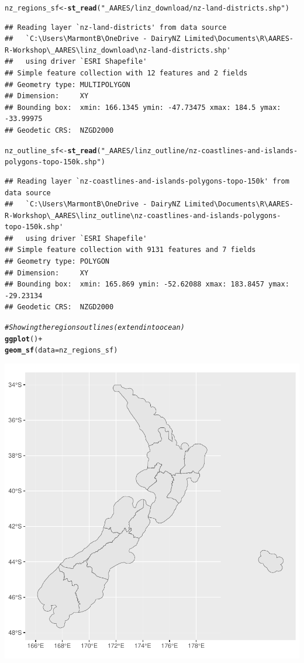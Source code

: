 \documentclass{article}\usepackage[]{graphicx}\usepackage[]{xcolor}
\makeatletter
\newcommand{\hlstr}[1]{\textcolor[rgb]{0.192,0.494,0.8}{#1}}%
\newcommand{\hlcom}[1]{\textcolor[rgb]{0.678,0.584,0.686}{\textit{#1}}}%
\newcommand{\hlopt}[1]{\textcolor[rgb]{0,0,0}{#1}}%
\newcommand{\hlstd}[1]{\textcolor[rgb]{0.345,0.345,0.345}{#1}}%
\newcommand{\hlkwb}[1]{\textcolor[rgb]{0.69,0.353,0.396}{#1}}%
\newcommand{\hlkwc}[1]{\textcolor[rgb]{0.333,0.667,0.333}{#1}}%
\newcommand{\hlkwd}[1]{\textcolor[rgb]{0.737,0.353,0.396}{\textbf{#1}}}%
\newenvironment{kframe}{%
 \def\at@end@of@kframe{}%
 \ifinner\ifhmode%
  \def\at@end@of@kframe{\end{minipage}}%
  \begin{minipage}{\columnwidth}%
 \fi\fi%
 \def\FrameCommand##1{\hskip\@totalleftmargin \hskip-\fboxsep
 \colorbox{shadecolor}{##1}\hskip-\fboxsep
     \hskip-\linewidth \hskip-\@totalleftmargin \hskip\columnwidth}%
 \MakeFramed {\advance\hsize-\width
   \@totalleftmargin\z@ \linewidth\hsize
   \@setminipage}}%
 {\par\unskip\endMakeFramed%
 \at@end@of@kframe}
\newenvironment{knitrout}{}{} %
\makeatother
\begin{document}
\begin{knitrout}
\begin{kframe}
\begin{alltt}
\hlstd{nz_regions_sf} \hlkwb{<-} \hlkwd{st_read}\hlstd{(}\hlstr{"_AARES/linz_download/nz-land-districts.shp"}\hlstd{)}
\end{alltt}
\begin{verbatim}
## Reading layer `nz-land-districts' from data source 
##   `C:\Users\MarmontB\OneDrive - DairyNZ Limited\Documents\R\AARES-R-Workshop\_AARES\linz_download\nz-land-districts.shp' 
##   using driver `ESRI Shapefile'
## Simple feature collection with 12 features and 2 fields
## Geometry type: MULTIPOLYGON
## Dimension:     XY
## Bounding box:  xmin: 166.1345 ymin: -47.73475 xmax: 184.5 ymax: -33.99975
## Geodetic CRS:  NZGD2000
\end{verbatim}
\begin{alltt}
\hlstd{nz_outline_sf} \hlkwb{<-} \hlkwd{st_read}\hlstd{(}\hlstr{"_AARES/linz_outline/nz-coastlines-and-islands-polygons-topo-150k.shp"}\hlstd{)}
\end{alltt}
\begin{verbatim}
## Reading layer `nz-coastlines-and-islands-polygons-topo-150k' from data source 
##   `C:\Users\MarmontB\OneDrive - DairyNZ Limited\Documents\R\AARES-R-Workshop\_AARES\linz_outline\nz-coastlines-and-islands-polygons-topo-150k.shp' 
##   using driver `ESRI Shapefile'
## Simple feature collection with 9131 features and 7 fields
## Geometry type: POLYGON
## Dimension:     XY
## Bounding box:  xmin: 165.869 ymin: -52.62088 xmax: 183.8457 ymax: -29.23134
## Geodetic CRS:  NZGD2000
\end{verbatim}
\begin{alltt}
\hlcom{# Showing the regions outlines (extend into ocean)}
\hlkwd{ggplot}\hlstd{()} \hlopt{+}
  \hlkwd{geom_sf}\hlstd{(}\hlkwc{data} \hlstd{= nz_regions_sf)}
\end{alltt}
\end{kframe}

{\centering \includegraphics[width=.6\linewidth]{figure/introduction-to-R-for-economists-Rnwauto-report-3} 

}
\end{knitrout}
\end{document}
